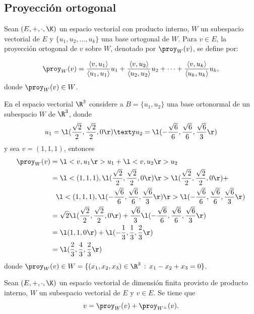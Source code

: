\documentclass[compacto,10pt]{pubciencias-notas}
\begin{document}
\subsection{Proyección ortogonal}
\setcounter{defi}{8}
\begin{defi}
Sean $(E,+,\cdot,\K)$ un espacio vectorial con producto interno, 
$W$ un subespacio vectorial de $E$ y  $\{u_1, u_2, \ldots, u_k \}$ una base ortogonal de $W$. Para $v \in E$, la proyección ortogonal de $v$ sobre $W$, denotado por $\proy_W (v)$, se define por:

\[   \proy_W(v) = \dfrac{\left<v,u_1 \right>}{\left<u_1, u_1 \right\rangle }u_1 +
   \dfrac{\left<v,u_2 \right\rangle}{\left<u_2, u_2 \right\rangle}u_2 +
   \cdots +
   \dfrac{\left<v,u_k \right\rangle}{\left<u_k, u_k \right\rangle}u_k,
\]
donde $\proy_W (v) \in W$.
\end{defi}
\begin{ejem}\hspace{0pt}\label{ProyeccionOrtogonal} En el espacio vectorial $\R^{3}$ considere a $B=\{u_1, u_2\}$ una base ortonormal de un subespacio $W$ de $\R^3$, donde
\[
    u_1 = \l(\dfrac{\sqrt{2}}{2},\dfrac{\sqrt{2}}{2},0\r)
    \texty
    u_2 = \l(- \dfrac{\sqrt{6}}{6},\dfrac{\sqrt{6}}{6}, \dfrac{\sqrt{6}}{3}\r)
\]
y sea $v = (1,1,1)$, entonces
\begin{align*}
\proy_W(v)
&= \l<v, u_1\r> u_1 + \l<v, u_2\r> u_2\\
&= \l<(1, 1, 1), \l(\dfrac{\sqrt{2}}{2},\dfrac{\sqrt{2}}{2},0\r)\r> \l(\dfrac{\sqrt{2}}{2},\dfrac{\sqrt{2}}{2},0\r) +\\
&\phantom{= } \l<(1, 1, 1), 
\l(- \dfrac{\sqrt{6}}{6},\dfrac{\sqrt{6}}{6}, \dfrac{\sqrt{6}}{3}\r)\r> \l(- \dfrac{\sqrt{6}}{6},\dfrac{\sqrt{6}}{6}, \dfrac{\sqrt{6}}{3}\r)\\
&= \sqrt{2}\l(\dfrac{\sqrt{2}}{2},\dfrac{\sqrt{2}}{2},0\r) + \dfrac{\sqrt{6}}{3} 
\l(- \dfrac{\sqrt{6}}{6},\dfrac{\sqrt{6}}{6}, \dfrac{\sqrt{6}}{3}\r)\\
&= \l(1, 1, 0\r) + \l(- \dfrac{1}{3}, \dfrac{1}{3}, \dfrac{2}{3}\r)\\
&= \l(\dfrac{2}{3}, \dfrac{4}{3}, \dfrac{2}{3}\r)
\end{align*}
donde $\proy_W(v) \in W = \{(x_{1}, x_{2}, x_{3})\in\R^{3}\,:\,x_{1} - x_{2} + x_{3} = 0\}$.
\end{ejem}
\begin{teo}\label{TeoProyec}
Sean $(E,+,\cdot,\K)$ un espacio vectorial de dimensión finita provisto de producto interno, $W$ un subespacio vectorial de $E$ y $v \in E$. Se tiene que
\[
    v = \proy_W( v) + \proy_{W^\perp}( v).
\]
\end{teo}
\end{document}
